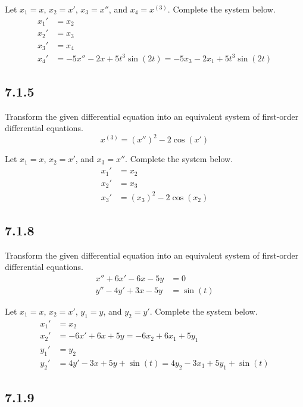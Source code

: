 \documentclass{article}
\begin{document}
Let $ x_1 = x $, $ x_2 = x' $, $ x_3 = x'' $, and $ x_4 = x^{(3)} $. Complete the system below.
\begin{align*}
	x_1' & = x_2 \\
	x_2' & = x_3 \\
	x_3' & = x_4 \\
	x_4' & = -5x'' - 2x + 5t^3\sin(2t) = -5x_3 - 2x_1 + 5t^3\sin(2t)
\end{align*}

\subsection{7.1.5}

Transform the given differential equation into an equivalent system of first-order differential equations.
\begin{equation*}
	x^{(3)} = (x'')^2 - 2\cos(x')
\end{equation*}

\hr

Let $ x_1 = x $, $ x_2 = x' $, and $ x_3 = x'' $. Complete the system below.
\begin{align*}
	x_1' & = x_2 \\
	x_2' & = x_3 \\
	x_3' & = (x_3)^2 - 2\cos(x_2)
\end{align*}

\subsection{7.1.8}

Transform the given differential equation into an equivalent system of first-order differential equations.
\begin{align*}
	x'' + 6x' - 6x - 5y & = 0 \\
	y'' - 4y' + 3x - 5y & = \sin(t)
\end{align*}

\hr

Let $ x_1 = x $, $ x_2 = x' $, $ y_1 = y $, and $ y_2 = y' $. Complete the system below.
\begin{align*}
	x_1' & = x_2 \\
	x_2' & = -6x' + 6x + 5y = -6x_2 + 6x_1 + 5y_1 \\
	y_1' & = y_2 \\
	y_2' & = 4y' - 3x + 5y + \sin(t) = 4y_2 - 3x_1 + 5y_1 + \sin(t)
\end{align*}

\subsection{7.1.9}
\end{document}
